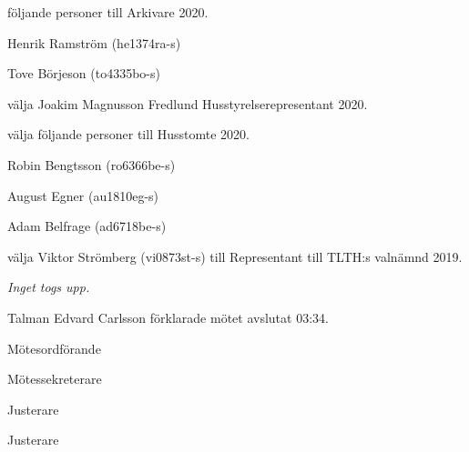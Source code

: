 \documentclass[10pt]{article}
\def\mo{Edvard Carlsson}
\def\ms{Mattias Lundström}
\def\ji{Malin Svärdling}
\def\jii{Henrik Ramström}
\def\jiii{Theo Nyman}
\begin{document}
\begin{paragrafer}
\begin{paralist}
    \Mba följande personer till Arkivare 2020.
    \begin{tightdashlist}
        \item Henrik Ramström (he1374ra-s)
        \item Tove Börjeson (to4335bo-s)
    \end{tightdashlist}

    \Mba välja Joakim Magnusson Fredlund Husstyrelserepresentant 2020.

    \Mba välja följande personer till Husstomte 2020.
    \begin{tightdashlist}
        \item Robin Bengtsson (ro6366be-s)
        \item August Egner (au1810eg-s)
        \item Adam Belfrage (ad6718be-s)
    \end{tightdashlist}
    

    \Mba välja Viktor Strömberg (vi0873st-s) till Representant till TLTH:s valnämnd 2019.

\end{paralist}

\emph{Inget togs upp.}

Talman {\mo} förklarade mötet avslutat 03:34.


\end{paragrafer}

\newpage
\hidesignfoot
\begin{signatures}{5}
\signature{\mo}{Mötesordförande}
\signature{\ms}{Mötessekreterare}
\signature{\ji}{Justerare}
\signature{\jii}{Justerare}
\end{signatures}
\end{document}
